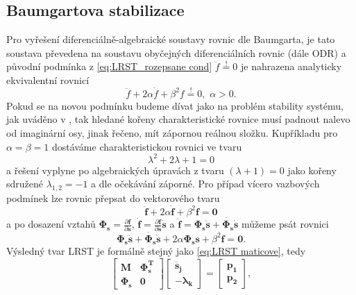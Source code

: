 \subsection{Baumgartova stabilizace}\label{sec:Baumgart}
Pro vyřešení diferenciálně-algebraické soustavy rovnic dle Baumgarta, je tato soustava převedena na soustavu obyčejných diferenciálních rovnic (dále ODR) a původní podmínka z \ref{eq:LRST_rozepsane cond} $ \ddot{f} \stackrel{!}{=} 0$ je nahrazena analyticky ekvivalentní rovnicí \cite{cite:bible}
\begin{equation}\label{eq:Baum podminka}
	\ddot{f} + 2\alpha \dot{f}+\beta^2f \stackrel{!}{=} 0, \,\, \alpha>0.
\end{equation}
Pokud se na novou podmínku budeme dívat jako na problém stability systému, jak uváděno v \cite{cite:aretko}, tak hledané kořeny charakteristické rovnice musí padnout nalevo od imaginární osy, jinak řečeno, mít zápornou reálnou složku. Kupříkladu pro $ \alpha = \beta = 1 $ dostáváme charakteristickou rovnici ve tvaru
\begin{equation}\label{eq:char rce}
	\lambda^2 + 2\lambda +1 = 0
\end{equation}
a řešení vyplyne po algebraických úpravách z tvaru $ (\lambda+1) = 0 $ jako kořeny sdružené $  \lambda_{1,2}=-1$ a dle očekávání záporné.
Pro případ vícero vazbových podmínek lze rovnic přepsat do vektorového tvaru \cite{cite:bible}
\begin{equation}\label{eq:Baum podminka vekt}
	\mathbf{\ddot{f}}+2\alpha \mathbf{\dot{f}}+\beta^2\mathbf{f}=\mathbf{0}
\end{equation}
a po dosazení vztahů $ \mathbf{\Phi_s} = \frac{\partial \mathbf{f}}{\partial \mathbf{s}} $, $ \mathbf{\dot{f}} = \frac{\partial \mathbf{f}}{\partial \mathbf{s}}\mathbf{\dot{s}} $ a $ \mathbf{\ddot{f}} = \mathbf{\Phi_s}\mathbf{\ddot{s}} + \mathbf{\dot{\Phi_s}}\mathbf{\dot{s}} $ můžeme psát rovnici
\begin{equation}\label{eq:Baum podminka vekt s Jac}
	\mathbf{\Phi_s}\mathbf{\ddot{s}} + \mathbf{\dot{\Phi_s}}\mathbf{\dot{s}} + 2\alpha \mathbf{\Phi_s} \mathbf{s} + \beta^2\mathbf{f} =\mathbf{0}.
\end{equation}
Výsledný tvar LRST  je formálně stejný jako \ref{eq:LRST maticove}, tedy
\begin{equation*}
	\begin{bmatrix}
		\mathbf{M} & \mathbf{\Phi_s^T} \\
		\mathbf{\Phi_s} & \mathbf{0}
	\end{bmatrix}
	\begin{bmatrix}
		\mathbf{\ddot{s_j}}\\
		\mathbf{-\lambda_k}
	\end{bmatrix}
	=
	\begin{bmatrix}
		\mathbf{p_1}\\
		\mathbf{p_2}
	\end{bmatrix},
\end{equation*}
